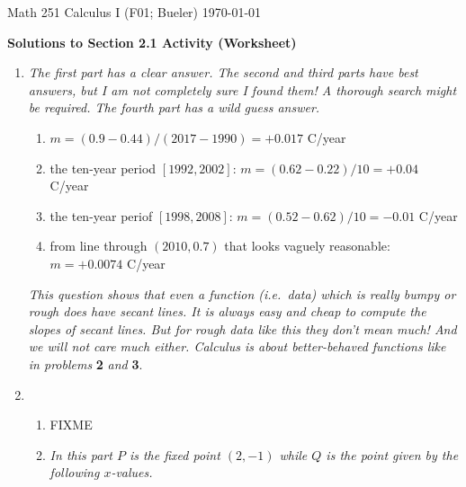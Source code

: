 \documentclass[11pt]{amsart}
\begin{document}
\noindent \scriptsize Math 251 Calculus I (F01; Bueler) \hfill \today

\bigskip
\Large\centerline{\textbf{Solutions to  Section 2.1 Activity (Worksheet)}}

\normalsize
\thispagestyle{empty}

\bigskip
\renewcommand{\labelenumi}{\textbf{\arabic{enumi}.}}
\begin{enumerate}
\item \emph{The first part has a clear answer.  The second and third parts have best answers, but I am not completely sure I found them!  A thorough search might be required.  The fourth part has a wild guess answer.} 

\medskip
    \renewcommand{\labelenumii}{\arabic{enumii}.}
    \begin{enumerate}
    \item $m = (0.9-0.44) / (2017-1990) = + 0.017$ C/year
    \item the ten-year period $[1992,2002]$: \quad $m=(0.62 - 0.22) / 10 = + 0.04$ C/year
    \item the ten-year periof $[1998,2008]$: \quad $m=(0.52 - 0.62) / 10 = - 0.01$ C/year
    \item from line through $(2010,0.7)$ that looks vaguely reasonable: $m = + 0.0074$ C/year
    \end{enumerate}

\medskip
\noindent \emph{This question shows that even a function (i.e.~data) which is really bumpy or rough \emph{does} have secant lines.  It is always easy and cheap to compute the slopes of secant lines.  But for rough data like this they don't mean much!  And we will not care much either.  Calculus is about better-behaved functions like in problems} \textbf{2} \emph{and} \textbf{3}.

\item 
\medskip
    \renewcommand{\labelenumii}{\alph{enumii})}
    \begin{enumerate}
    \item

        FIXME
    \item \emph{In this part $P$ is the fixed point $(2,-1)$ while $Q$ is the point given by the following $x$-values.}
    

\end{enumerate}
\end{enumerate}
\end{document}
